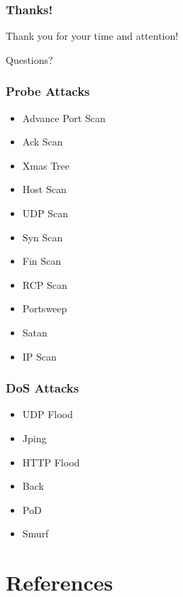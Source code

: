 \documentclass{beamer}
\newcommand{\linespace}{\vskip 0.25cm}
\begin{document}
\begin{frame}
	\frametitle{Thanks!}
	
	Thank you for your time and attention!
		
	\linespace
	\linespace
	
	\begin{center}
	{\Large Questions?}
	\end{center}
\end{frame}


\begin{frame}
	\frametitle{Probe Attacks}
	\begin{itemize}
		\item Advance Port Scan
		\item Ack Scan
		\item Xmas Tree
		\item Host Scan
		\item UDP Scan
		\item Syn Scan
		\item Fin Scan
		\item RCP Scan
		\item Portsweep
		\item Satan
		\item IP Scan
	\end{itemize}
\end{frame}


\begin{frame}
	\frametitle{DoS Attacks}
	\begin{itemize}
		\item UDP Flood
		\item Jping
		\item HTTP Flood
		\item Back
		\item PoD
		\item Smurf
	\end{itemize}
\end{frame}

\section*{References}
\end{document}
